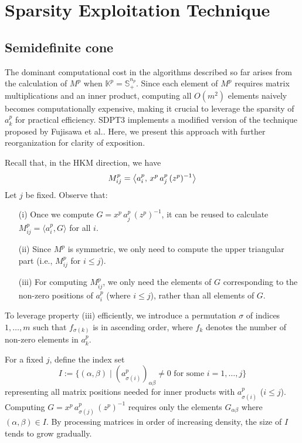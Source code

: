 \section{Sparsity Exploitation Technique} \label{sec:exploit_sparsity}
\subsection{Semidefinite cone} \label{sec:exploit_sparsity_sdp}
The dominant computational cost in the algorithms described so far arises from the calculation of $M^p$ when $\mathbb{K}^p = \mathbb{S}^{n_p}_+$. 
Since each element of $M^p$ requires matrix multiplications and an inner product, computing all $O(m^2)$ elements naively becomes computationally expensive, making it crucial to leverage the sparsity of $a^p_k$ for practical efficiency. 
SDPT3 implements a modified version of the technique proposed by Fujisawa et al.\cite{Fujisawa1997}. Here, we present this approach with further reorganization for clarity of exposition.

\medskip

Recall that, in the HKM direction, we have
\[
  M^p_{ij}
  = \left\langle a^p_i, \, x^p\,a^p_j\,(z^p)^{-1} \right\rangle
\]
Let $j$ be fixed. Observe that:
\begin{enumerate}
\item[(i)] Once we compute $G = x^p\,a^p_j\,(z^p)^{-1}$, it can be reused to calculate $M^p_{ij} = \langle a^p_i, G \rangle$ for all $i$.
\item[(ii)] Since $M^p$ is symmetric, we only need to compute the upper triangular part (i.e., $M^p_{ij}$ for $i \leq j$).
\item[(iii)] For computing $M^p_{ij}$, we only need the elements of $G$ corresponding to the non-zero positions of $a^p_i$ (where $i \leq j$), rather than all elements of $G$.
\end{enumerate}

To leverage property (iii) efficiently, we introduce a permutation $\sigma$ of indices $1,\ldots,m$ such that $f_{\sigma(k)}$ is in ascending order, where $f_k$ denotes the number of non-zero elements in $a^p_k$.

For a fixed $j$, define the index set
\[
  I
  := \bigl\{(\alpha,\beta)\mid (a^p_{\sigma(i)})_{\alpha\beta}\neq 0
         \text{ for some } i=1,\ldots,j \bigr\}
\]
representing all matrix positions needed for inner products with $a^p_{\sigma(i)}$ ($i \leq j$).
Computing $G = x^p\,a^p_{\sigma(j)}\,(z^p)^{-1}$ requires only the elements $G_{\alpha\beta}$ where $(\alpha,\beta) \in I$. By processing matrices in order of increasing density, the size of $I$ tends to grow gradually.


